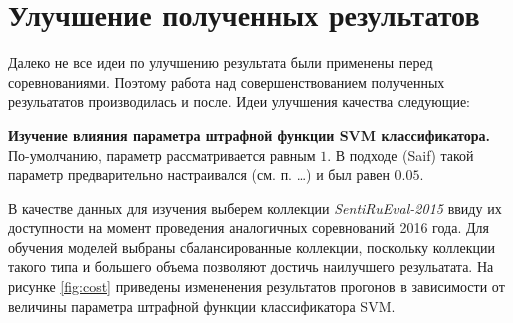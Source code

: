 \section{Улучшение полученных результатов}
Далеко не все идеи по улучшению результата были применены перед соревнованиями.
Поэтому работа над совершенствованием полученных резульататов производилась и
после. Идеи улучшения качества следующие:

{\bf Изучение влияния параметра штрафной функции SVM классификатора.}
По-умолчанию, параметр рассматривается равным $1$. В подходе (Saif) такой
параметр предварительно настраивался (см. п. …) и был равен $0.05$.


В качестве данных для изучения выберем коллекции {\it SentiRuEval-2015} ввиду их
доступности на момент проведения аналогичных соревнований 2016 года. Для
обучения моделей выбраны сбалансированные коллекции, поскольку коллекции такого
типа и большего объема позволяют достичь наилучшего резульатата. На рисунке
\ref{fig:cost} приведены измененения результатов прогонов в зависимости от
величины параметра штрафной функции классификатора SVM.

